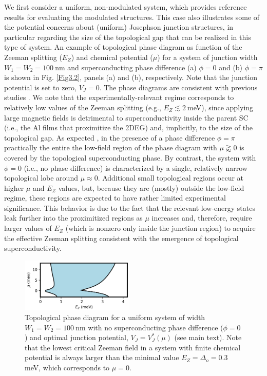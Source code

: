 \documentclass[twocolumn,aps,prb,nofootinbib]{revtex4-2}
\begin{document}
We first consider a uniform, non-modulated system, which provides reference results for evaluating the modulated structures. This case also illustrates some of the potential concerns about (uniform) Josephson junction structures, in particular regarding the size of the topological gap that can be realized in this type of system.
An example of topological phase diagram as function of the Zeeman splitting ($E_Z$) and chemical potential ($\mu$) for a system of junction width $W_1 = W_2 = 100~\text{nm}$ and superconducting phase difference (a) $\phi = 0$ and (b) $\phi = \pi$ is shown in Fig. \ref{Fig3.2}, panels (a) and (b), respectively. 
Note that the junction potential is set to zero, $V_J = 0$. The phase diagrams are consistent with previous studies \cite{Hell2017a,Pientka2017}. We note that the experimentally-relevant regime corresponds to relatively low values of the Zeeman splitting (e.g., $E_Z \lesssim 2~$meV), since applying large magnetic fields is detrimental to superconductivity inside the parent SC (i.e., the Al films that proximitize the 2DEG) and, implicitly, to the size of the topological gap. As expected \cite{Hell2017a,Pientka2017}, in the presence of a phase difference $\phi=\pi$ practically the entire the low-field region of the phase diagram with $\mu \gtrapprox 0$ is covered by the topological superconducting phase. 
By contrast,  the system with $\phi = 0$ (i.e., no phase difference) is characterized by a single, relatively narrow topological lobe around $\mu\approx 0$. Additional small topological regions occur at higher $\mu$ and $E_Z$  values, but, because they are (mostly) outside the low-field regime, these regions are expected to have rather limited experimental significance. 
This behavior is due to the fact that the relevant low-energy states leak further into the proximitized regions as $\mu$ increases and, therefore, require larger values of $E_Z$ (which is nonzero only inside the junction region) to acquire the effective Zeeman splitting consistent with the emergence of topological superconductivity. 

\begin{figure}[t]
\begin{center}
\includegraphics[width=0.48\textwidth]{Fig4.png}
\end{center}
\vspace{-3mm}
\caption{Topological phase diagram for a uniform system of width $W_1 = W_2 = 100~\text{nm}$ with no superconducting phase difference ($\phi=0$) and optimal junction potential, $V_J=V_J^*(\mu)$ (see main text). Note that the lowest critical Zeeman field in a system with finite chemical potential is always larger than the minimal value $E_Z = \Delta_o=0.3~$meV, which corresponds to $\mu=0$.}
\label{FIG4}
\vspace{-3mm}
\end{figure}
\end{document}

